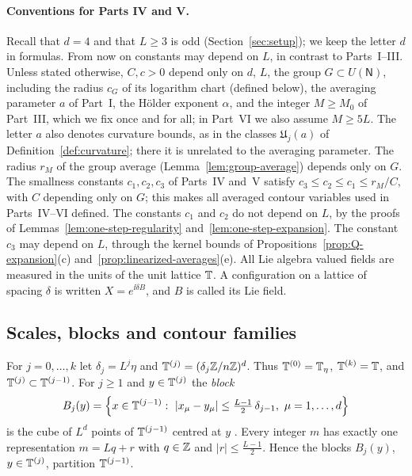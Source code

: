\paragraph{Conventions for Parts IV and V.} Recall that $d=4$ and that $L\ge3$ is odd (Section~\ref{sec:setup}); we keep the letter $d$ in formulas. From now on constants may depend on $L$, in contrast to Parts~I--III. Unless stated otherwise, $C,c>0$ depend only on $d$, $L$, the group $G\subset U(\mathsf N)$, including the radius $c_G$ of its logarithm chart (defined below), the averaging parameter $a$ of Part~I, the H\"older exponent $\alpha$, and the integer $M\ge M_0$ of Part~III, which we fix once and for all; in Part~VI we also assume $M\ge5L$. The letter $a$ also denotes curvature bounds, as in the classes $\mathfrak U_j(a)$ of Definition~\ref{def:curvature}; there it is unrelated to the averaging parameter. The radius $r_M$ of the group average (Lemma~\ref{lem:group-average}) depends only on $G$. The smallness constants $c_1,c_2,c_3$ of Parts~IV and~V satisfy $c_3\le c_2\le c_1\le r_M/C$, with $C$ depending only on $G$; this makes all averaged contour variables used in Parts~IV--VI defined. The constants $c_1$ and $c_2$ do not depend on $L$, by the proofs of Lemmas~\ref{lem:one-step-regularity} and~\ref{lem:one-step-expansion}. The constant $c_3$ may depend on $L$, through the kernel bounds of Propositions~\ref{prop:Q-expansion}(c) and~\ref{prop:linearized-averages}(e). All Lie algebra valued fields are measured in the units of the unit lattice $\mathbb T$. A configuration on a lattice of spacing $\delta$ is written $X=e^{\ii\delta B}$, and $B$ is called its Lie field.

\subsection{Scales, blocks and contour families}\label{ss:21.1}

For $j=0,\dots,k$ let $\delta_j=L^j\eta$ and $\mathbb T^{(j)}=(\delta_j\mathbb Z/n\mathbb Z)^d$. Thus $\mathbb T^{(0)}=\mathbb T_\eta$, $\mathbb T^{(k)}=\mathbb T$, and $\mathbb T^{(j)}\subset\mathbb T^{(j-1)}$. For $j\ge1$ and $y\in\mathbb T^{(j)}$ the \emph{block}
\[
B_j(y)=\Big\{x\in\T^{(j-1)}:\ |x_\mu-y_\mu|\le\tfrac{L-1}2\,\delta_{j-1},\ \mu=1,\dots,d\Big\}
\]
is the cube of $L^d$ points of $\mathbb T^{(j-1)}$ centred at $y$ \cite[(0.3)]{BalYM4I}. Every integer $m$ has exactly one representation $m=Lq+r$ with $q\in\mathbb Z$ and $|r|\le\frac{L-1}2$. Hence the blocks $B_j(y)$, $y\in\mathbb T^{(j)}$, partition $\mathbb T^{(j-1)}$.

